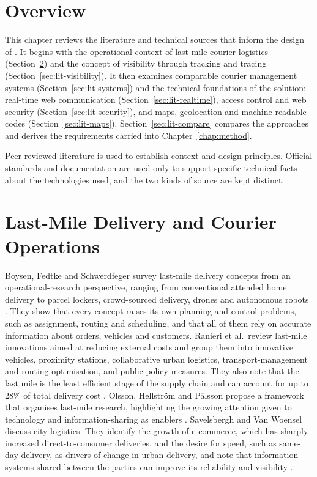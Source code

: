 \section{Overview}

This chapter reviews the literature and technical sources that inform the design of \scpms. It begins with the operational context of last-mile courier logistics (Section~\ref{sec:lit-lastmile}) and the concept of visibility through tracking and tracing (Section~\ref{sec:lit-visibility}). It then examines comparable courier management systems (Section~\ref{sec:lit-systems}) and the technical foundations of the solution: real-time web communication (Section~\ref{sec:lit-realtime}), access control and web security (Section~\ref{sec:lit-security}), and maps, geolocation and machine-readable codes (Section~\ref{sec:lit-maps}). Section~\ref{sec:lit-compare} compares the approaches and derives the requirements carried into Chapter~\ref{chap:method}.

Peer-reviewed literature is used to establish context and design principles. Official standards and documentation are used only to support specific technical facts about the technologies used, and the two kinds of source are kept distinct.

\section{Last-Mile Delivery and Courier Operations}
\label{sec:lit-lastmile}

Boysen, Fedtke and Schwerdfeger survey last-mile delivery concepts from an operational-research perspective, ranging from conventional attended home delivery to parcel lockers, crowd-sourced delivery, drones and autonomous robots \cite{boysen2021lastmile}. They show that every concept raises its own planning and control problems, such as assignment, routing and scheduling, and that all of them rely on accurate information about orders, vehicles and customers. Ranieri et al.\ review last-mile innovations aimed at reducing external costs and group them into innovative vehicles, proximity stations, collaborative urban logistics, transport-management and routing optimisation, and public-policy measures. They also note that the last mile is the least efficient stage of the supply chain and can account for up to 28\% of total delivery cost \cite{ranieri2018review}. Olsson, Hellstr\"om and P\aa lsson propose a framework that organises last-mile research, highlighting the growing attention given to technology and information-sharing as enablers \cite{olsson2019framework}. Savelsbergh and Van Woensel discuss city logistics. They identify the growth of e-commerce, which has sharply increased direct-to-consumer deliveries, and the desire for speed, such as same-day delivery, as drivers of change in urban delivery, and note that information systems shared between the parties can improve its reliability and visibility \cite{savelsbergh2016city}.

